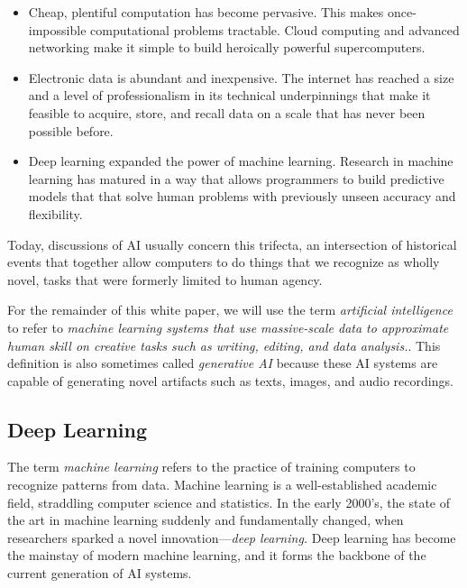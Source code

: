 \documentclass[12pt, oneside]{article}   	%
\begin{document}
\begin{itemize}
\item Cheap, plentiful computation has become pervasive.  This makes once-impossible computational problems tractable. Cloud computing and advanced networking make it simple to build heroically powerful supercomputers.
\item Electronic data is abundant and inexpensive.  The internet has reached a size and a level of professionalism in its technical underpinnings that make it feasible to acquire, store, and recall data on a scale that has never been possible before.
\item Deep learning expanded the power of machine learning. Research in machine learning has matured in a way that allows programmers to build predictive models that that solve human problems with previously unseen accuracy and flexibility.   
\end{itemize}

Today, discussions of AI usually concern this trifecta, an intersection of historical events that together allow computers to do things that we recognize as wholly novel, tasks that were formerly limited to human agency.

For the remainder of this white paper, we will use the term \emph{artificial intelligence} to refer to \emph{machine learning systems that use massive-scale data to approximate human skill on creative tasks such as writing, editing, and data analysis.}.   This definition is also sometimes called \emph{generative AI} because these AI systems are capable of generating novel artifacts such as texts, images, and audio recordings.


\subsection{Deep Learning}\label{section.definitions.deep-learning}
The term \emph{machine learning} refers to the practice of training computers to recognize patterns from data.  Machine learning is a well-established academic field, straddling computer science and statistics.  In the early 2000’s, the state of the art in machine learning suddenly and fundamentally changed, when researchers sparked a novel innovation—\emph{deep learning.}  Deep learning has become the mainstay of modern machine learning, and it forms the backbone of the current generation of AI systems.
\end{document}
